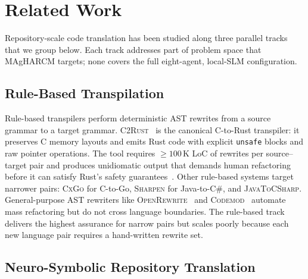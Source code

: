 \section{Related Work}
\label{sec:related}

Repository-scale code translation has been studied along three
parallel tracks that we group below. Each track addresses part of
problem space that MAgHARCM targets; none covers the full
eight-agent, local-SLM configuration.

\subsection{Rule-Based Transpilation}
\label{sec:related_transpilers}

Rule-based transpilers perform deterministic AST rewrites from a
source grammar to a target grammar. \textsc{C2Rust}~\cite{c2rust,p38_c2rust}
is the canonical C-to-Rust transpiler: it preserves C memory layouts
and emits Rust code with explicit \texttt{unsafe} blocks and raw
pointer operations. The tool requires $\ge 100\,\text{K}$ LoC of
rewrites per source--target pair and produces unidiomatic output that
demands human refactoring before it can satisfy Rust's safety
guarantees~\cite{siddiq2024oxidizer,p50_rav1d_c2rust_case,p51_libexpat_c2rust_case}.
Other rule-based systems target narrower pairs:
\textsc{CxGo} for C-to-Go, \textsc{Sharpen} for Java-to-C\#, and
\textsc{JavaToCSharp}. General-purpose AST rewriters like
    \textsc{OpenRewrite}~\cite{p39_openrewrite} and
    \textsc{Codemod}~\cite{codemod2020} automate mass refactoring but do not
cross language boundaries. The rule-based track delivers the highest
assurance for narrow pairs but scales poorly because each new
language pair requires a hand-written rewrite set.

\subsection{Neuro-Symbolic Repository Translation}
\label{sec:related_neurosym}

